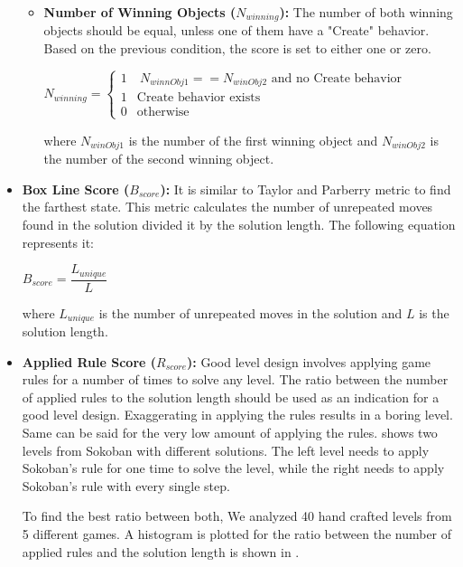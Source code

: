 \begin{itemize}
\begin{itemize}
		\item \textbf{Number of Winning Objects ($N_{winning}$):} The number of both winning objects should be equal, unless one of them have a "Create" behavior. Based on the previous condition, the score is set to either one or zero.
		\begin{center}
			$N_{winning}= \begin{cases}
			               1 & \ N_{winnObj1} == N_{winObj2} \text{ and no Create behavior}\\
			               1 & \text{Create behavior exists}\\
			               0 & \text{otherwise}
			           \end{cases}$
		\end{center}
		where $N_{winObj1}$ is the number of the first winning object and $N_{winObj2}$ is the number of the second winning object.
	\end{itemize}
	
	\item \textbf{Box Line Score ($B_{score}$):} It is similar to Taylor and Parberry\cite{sokobanLevelGenerationNew} metric to find the farthest state. This metric calculates the number of unrepeated moves found in the solution divided it by the solution length. The following equation represents it:
	\begin{center}$B_{score} = \dfrac{L_{unique}}{L}$\end{center}
	where $L_{unique}$ is the number of unrepeated moves in the solution and $L$ is the solution length.
	
	\item \textbf{Applied Rule Score ($R_{score}$):} Good level design involves applying game rules for a number of times to solve any level. The ratio between the number of applied rules to the solution length should be used as an indication for a good level design. Exaggerating in applying the rules results in a boring level. Same can be said for the very low amount of applying the rules.  shows two levels from Sokoban with different solutions. The left level needs to apply Sokoban's rule for one time to solve the level, while the right needs to apply Sokoban's rule with every single step.
	
	
	To find the best ratio between both, We analyzed 40 hand crafted levels from 5 different games. A histogram is plotted for the ratio between the number of applied rules and the solution length is shown in .
	

\end{itemize}
